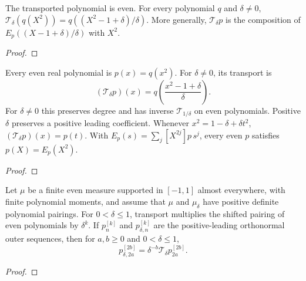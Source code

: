 \begin{supporting}
\begin{definition}
\end{definition}

\begin{theorem}
\label{thm:even-disk-transport-characterisation}
\leanok
The transported polynomial is even. For every polynomial $q$ and $\delta\ne0$,
$\mathcal T_\delta(q(X^2))=q((X^2-1+\delta)/\delta)$.
More generally, $\mathcal T_\delta p$ is the composition of
$E_p((X-1+\delta)/\delta)$ with $X^2$.
\end{theorem}
\begin{proof}
\leanok
\end{proof}

\begin{theorem}
\label{thm:even-disk-transport}
\leanok
Every even real polynomial is $p(x)=q(x^2)$. For $\delta\ne0$, its transport is
\[
 (\mathcal T_\delta p)(x)=q\!\left(\frac{x^2-1+\delta}{\delta}\right).
\]
For $\delta\ne0$ this preserves degree and has inverse $\mathcal T_{1/\delta}$
on even polynomials. Positive $\delta$ preserves a positive leading coefficient.
Whenever $x^2=1-\delta+\delta t^2$,
$(\mathcal T_\delta p)(x)=p(t)$.
With $E_p(s)=\sum_j[X^{2j}]p\,s^j$, every even $p$ satisfies $p(X)=E_p(X^2)$.
\end{theorem}
\begin{proof}
\leanok
\end{proof}

\begin{theorem}
\label{thm:deformed-outer-normalization}
\leanok
Let $\mu$ be a finite even measure supported in $[-1,1]$ almost everywhere,
with finite polynomial moments, and assume that $\mu$ and $\mu_\delta$ have
positive definite polynomial pairings. For $0<\delta\le1$, transport multiplies
the shifted pairing of even polynomials by $\delta^k$.
If $p_n^{[k]}$ and $p_{\delta,n}^{[k]}$ are the positive-leading orthonormal
outer sequences, then for $a,b\ge0$ and $0<\delta\le1$,
\[
 p_{\delta,2a}^{[2b]}=\delta^{-b}\mathcal T_\delta p_{2a}^{[2b]}.
\]
\end{theorem}
\begin{proof}
\leanok
\end{proof}


\end{supporting}
